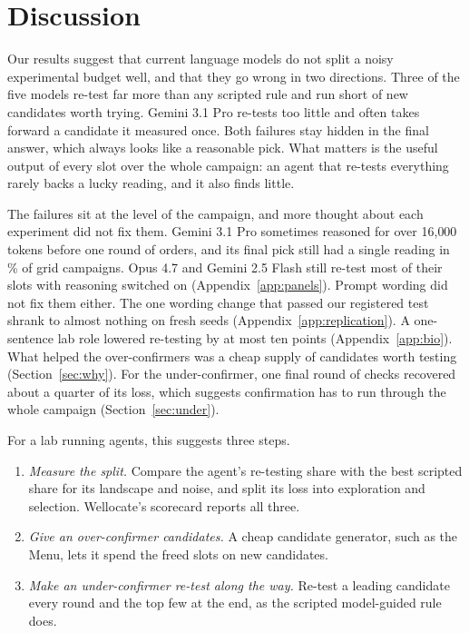 \section{Discussion}
\label{sec:discussion}

Our results suggest that current language models do not split a noisy experimental budget well, and that they go wrong
in two directions. Three of the five models re-test far more than any scripted rule and run short of new candidates
worth trying. Gemini 3.1 Pro re-tests too little and often takes forward a candidate it measured once. Both failures
stay hidden in the final answer, which always looks like a reasonable pick. What matters is the useful output of every
slot over the whole campaign: an agent that re-tests everything rarely backs a lucky reading, and it also finds little.

The failures sit at the level of the campaign, and more thought about each experiment did not fix them. Gemini 3.1 Pro
sometimes reasoned for over 16{,}000 tokens before one round of orders, and its final pick still had a single reading in
\nProOneReading\% of grid campaigns. Opus 4.7 and Gemini 2.5 Flash still re-test most of
their slots with reasoning switched on (Appendix~\ref{app:panels}). Prompt wording did not fix them either. The one wording change that passed our registered test shrank to almost
nothing on fresh seeds (Appendix~\ref{app:replication}). A one-sentence lab role lowered re-testing by at most
ten points (Appendix~\ref{app:bio}). What helped the over-confirmers was a cheap supply of
candidates worth testing (Section~\ref{sec:why}). For the under-confirmer, one final round of checks recovered about a
quarter of its loss, which suggests confirmation has to run through the whole campaign (Section~\ref{sec:under}).

For a lab running agents, this suggests three steps.
\begin{enumerate}
\item \emph{Measure the split.} Compare the agent's re-testing share with the best scripted share for its landscape
and noise, and split its loss into exploration and selection. Wellocate's scorecard reports all three.
\item \emph{Give an over-confirmer candidates.} A cheap candidate generator, such as the Menu, lets it spend the freed
slots on new candidates.
\item \emph{Make an under-confirmer re-test along the way.} Re-test a leading candidate every round and the top
few at the end, as the scripted model-guided rule does.
\end{enumerate}

